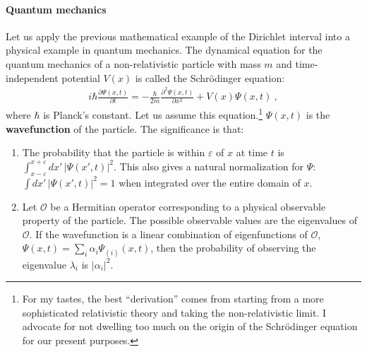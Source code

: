 \paragraph{Quantum mechanics}
Let us apply the previous mathematical example of the Dirichlet interval into a physical example in quantum mechanics. The dynamical equation for the quantum mechanics of a non-relativistic particle with mass $m$ and time-independent potential $V(x)$ is called the Schr\"odinger equation:
\begin{align}
    i\hbar \frac{\partial \Psi(x,t)}{\partial t}
    = -\frac{\hbar}{2m}\frac{\partial^2 \Psi(x,t)}{\partial x^2} + V(x)\Psi(x,t) \ ,
\end{align}
where $\hbar$ is Planck's constant. Let us assume this equation.\footnote{For my tastes, the best ``derivation'' comes from starting from a more sophisticated relativistic theory and taking the non-relativistic limit. I advocate for not dwelling too much on the origin of the Schr\"odinger equation for our present purposes.} $\Psi(x,t)$ is the \textbf{wavefunction} of the particle. The significance is that:
\begin{enumerate}
    \item The probability that the particle is within $\varepsilon$ of $x$ at time $t$ is $\int_{x-\varepsilon}^{x+\varepsilon}dx'\, |\Psi(x',t)|^2$. This also gives a natural normalization for $\Psi$: $\int dx'\,|\Psi(x',t)|^2 = 1$ when integrated over the entire domain of $x$.
    \item Let $\mathcal O$ be a Hermitian operator corresponding to a physical observable property of the particle. The possible observable values are the eigenvalues of $\mathcal O$. If the wavefunction is a linear combination of eigenfunctions of $\mathcal O$, $\Psi(x,t) = \sum_{i}\alpha_i\Psi_{(i)}(x,t)$, then the probability of observing the eigenvalue $\lambda_i$ is $|\alpha_i|^2$. 
\end{enumerate}

